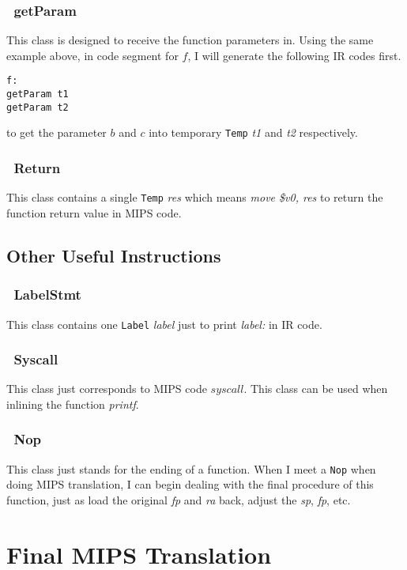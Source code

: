 \documentclass[journal]{IEEEtran}
\begin{document}
\subsubsection{\ getParam}
This class is designed to receive the function parameters in. Using the same example above, in code segment for $f$, I will generate the following IR codes first.
\begin{center}
\texttt{f: \ \  \ \ \ \  \ \  \ \  \ \  \ \ } \\
\texttt{getParam t1}  \\
\texttt{getParam t2} \\
\end{center}
to get the parameter $b$ and $c$ into temporary \texttt{Temp} \textit{t1} and \textit{t2} respectively.

\subsubsection{\ Return}
This class contains a single \texttt{Temp} \textit{res} which means \textit{move \$v0, res} to return the function return value in MIPS code.

\subsection{Other Useful Instructions}

\subsubsection{\ LabelStmt}
This class contains one \texttt{Label} \textit{label} just to print \textit{label:} in IR code.

\subsubsection{\ Syscall}
This class just corresponds to MIPS code $syscall$. This class can be used when inlining the function \textit{printf}.

\subsubsection{\ Nop}
This class just stands for the ending of a function. When I meet a \texttt{Nop} when doing MIPS translation, I can begin dealing with the final procedure of this function, just as load the original \textit{fp} and \textit{ra} back, adjust the \textit{sp}, \textit{fp}, etc.

\section{Final MIPS Translation}
\end{document}
